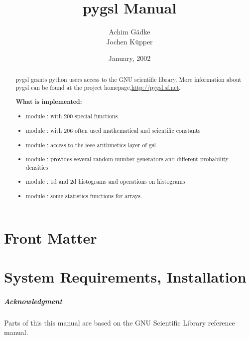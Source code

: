 \documentclass{manual}
\title{pygsl Manual}
\author{Achim G\"adke\makebox[0pt]{ \footnotemark[1]} \\
Jochen K\"upper}
\date{January, 2002}            %
\makeatletter
\let\py@OldOldChapter=\chapter
\renewcommand{\chapter}{\py@reset%
                        \py@OldOldChapter}
\newcommand{\GSL}{GNU Scientific Library}
\makeatother
\begin{document}
\maketitle

\ifhtml
\chapter*{Front Matter}
\label{front}
\fi



\begin{abstract}
   \noindent
   pygsl grants python users access to the GNU scientific library.
   More information about pygsl can be found at the project
   homepage,\url{http://pygsl.sf.net}.

   {\bf What is implemented:}
   \begin{itemize}
     \item module : with 200 special functions
     \item module : with 206 often used mathematical and scientific constants
     \item module : access to the ieee-arithmetics layer of gsl
     \item module : provides several random number generators and
                                      different probability densities
     \item module : 1d and 2d histograms and operations on histograms
     \item module : some statistics functions for arrays.
\end{itemize}

\end{abstract}


\tableofcontents


\chapter{System Requirements, Installation}
\label{cha:system-req-installation}


\paragraph*{Acknowledgment}
\label{sec:acknowledgment}
Parts of this this manual are based on the \GSL{} reference manual.
\end{document}

